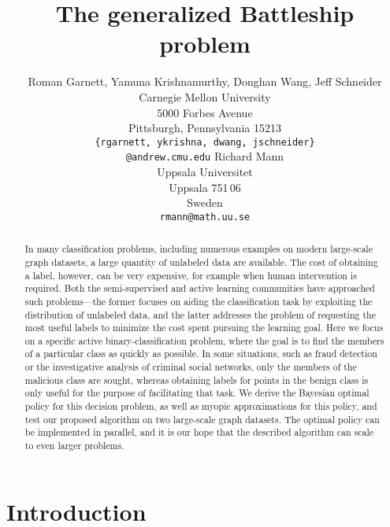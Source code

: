 \documentclass{article}
\begin{document}
\title{The generalized Battleship problem}
\author{
  Roman Garnett, Yamuna Krishnamurthy, Donghan Wang, Jeff Schneider\\
  Carnegie Mellon University\\
  5000 Forbes Avenue\\
  Pittsburgh, Pennsylvania 15213\\
  \texttt{\{rgarnett, ykrishna, dwang, jschneider\}\\@andrew.cmu.edu}
  \And
  Richard Mann\\
  Uppsala Universitet\\
  Uppsala 751\,06\\
  Sweden\\
  \texttt{rmann@math.uu.se}
}

\maketitle

\begin{abstract}
  In many classification problems, including numerous examples on
  modern large-scale graph datasets, a large quantity of unlabeled
  data are available. The cost of obtaining a label, however, can be
  very expensive, for example when human intervention is required.
  Both the semi-supervised and active learning communities have
  approached such problems---the former focuses on aiding the
  classification task by exploiting the distribution of unlabeled
  data, and the latter addresses the problem of requesting the most
  useful labels to minimize the cost spent pursuing the learning goal.
  Here we focus on a specific active binary-classification problem,
  where the goal is to find the members of a particular class as
  quickly as possible.  In some situations, such as fraud detection or
  the investigative analysis of criminal social networks, only the
  members of the malicious class are sought, whereas obtaining labels
  for points in the benign class is only useful for the purpose of
  facilitating that task.  We derive the Bayesian optimal policy for
  this decision problem, as well as myopic approximations for this
  policy, and test our proposed algorithm on two large-scale graph
  datasets.  The optimal policy can be implemented in parallel, and it
  is our hope that the described algorithm can scale to even larger
  problems.
\end{abstract}

\section{Introduction}
\end{document}
